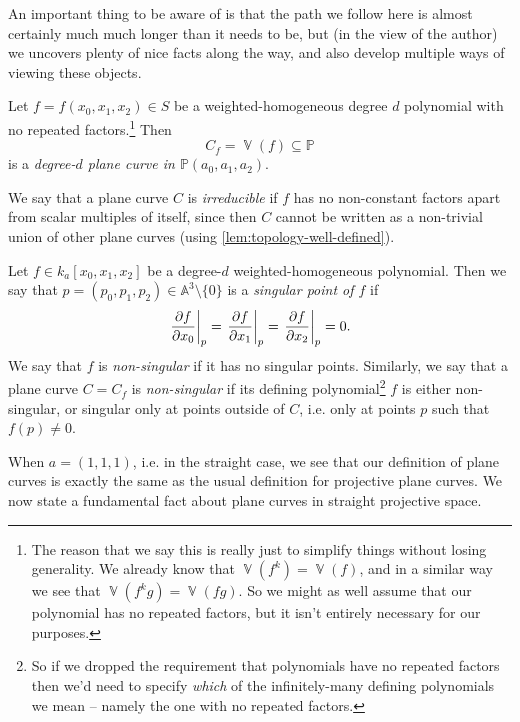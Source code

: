 \documentclass[10pt,notitlepage]{article}
\numberwithin{equation}{subsection}
\DeclareMathOperator{\van}{\mathbb{V}}
\newcommand{\aff}{\mathbb{A}}
\newcommand{\pee}{\mathbb{P}}
\newcommand{\noz}{\setminus\{0\}}
\newcommand{\kathree}{k_a[x_0,x_1,x_2]}
\newcommand{\pathree}{\pee(a_0,a_1,a_2)}
\newcommand{\poly}{S}
\begin{document}
    An important thing to be aware of is that the path we follow here is almost certainly much much longer than it needs to be, but (in the view of the author) we uncovers plenty of nice facts along the way, and also develop multiple ways of viewing these objects.

    \begin{definition}\label{defn:plane-curves-in-wps}
        Let $f=f(x_0,x_1,x_2)\in\poly$ be a weighted-homogeneous degree $d$ polynomial with no repeated factors.\footnote{%
            The reason that we say this is really just to simplify things without losing generality.
            We already know that $\van(f^k)=\van(f)$, and in a similar way we see that $\van(f^k g)=\van(fg)$.
            So we might as well assume that our polynomial has no repeated factors, but it isn't entirely necessary for our purposes.
        }
        Then
        \[
            C_f = \van(f) \subseteq \pee
        \]
        is a \emph{degree-$d$ plane curve in $\pathree$}.

        We say that a plane curve $C$ is \emph{irreducible} if $f$ has no non-constant factors apart from scalar multiples of itself, since then $C$ cannot be written as a non-trivial union of other plane curves (using \cref{lem:topology-well-defined}).
    \end{definition}

    \begin{definition}
        Let $f\in\kathree$ be a degree-$d$ weighted-homogeneous polynomial.
        Then we say that $p=(p_0,p_1,p_2)\in\aff^3\noz$ is a \emph{singular point of $f$} if
        \[
        \eval{\pdv{f}{x_0}}_p = \eval{\pdv{f}{x_1}}_p = \eval{\pdv{f}{x_2}}_p = 0.
        \]
        We say that $f$ is \emph{non-singular} if it has no singular points.
        Similarly, we say that a plane curve $C=C_f$ is \emph{non-singular} if its defining polynomial\footnote{%
            So if we dropped the requirement that polynomials have no repeated factors then we'd need to specify \emph{which} of the infinitely-many defining polynomials we mean -- namely the one with no repeated factors.
        } $f$ is either non-singular, or singular only at points outside of $C$, i.e. only at points $p$ such that $f(p)\neq0$.
    \end{definition}

    When $a=(1,1,1)$, i.e. in the straight case, we see that our definition of plane curves is exactly the same as the usual definition for projective plane curves.
    We now state a fundamental fact about plane curves in straight projective space.
\end{document}
